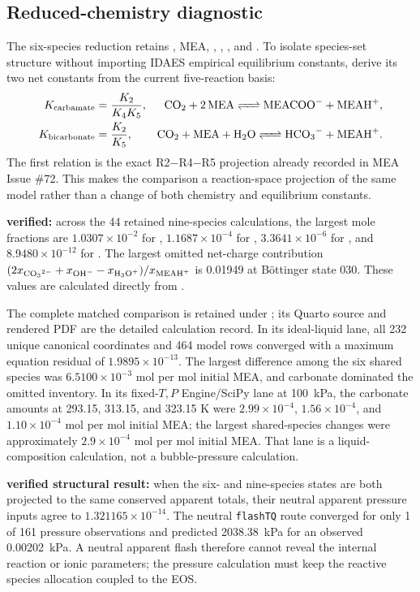 \documentclass[10pt,oneside]{scrartcl}
\begin{document}
\subsection{Reduced-chemistry diagnostic}

The six-species reduction retains , MEA, , ,
, and . To isolate species-set structure without
importing IDAES empirical equilibrium constants, derive its two net constants
from the current five-reaction basis:
\begin{align}
K_{\mathrm{carbamate}} &= \frac{K_2}{K_4K_5}, &
\ce{CO2 + 2MEA <=> MEACOO- + MEAH+},\\
K_{\mathrm{bicarbonate}} &= \frac{K_2}{K_5}, &
\ce{CO2 + MEA + H2O <=> HCO3- + MEAH+}.
\end{align}
The first relation is the exact R2$-$R4$-$R5 projection already recorded in
MEA Issue \#72. This makes the comparison a reaction-space projection of the
same model rather than a change of both chemistry and equilibrium constants.

\textbf{verified:} across the 44 retained nine-species calculations, the
largest mole fractions are $1.0307\times10^{-2}$ for ,
$1.1687\times10^{-4}$ for , $3.3641\times10^{-6}$ for ,
and $8.9480\times10^{-12}$ for . The largest omitted net-charge
contribution $(2x_{\ce{CO3^2-}}+x_{\ce{OH-}}-x_{\ce{H3O+}})/x_{\ce{MEAH+}}$
is 0.01949 at B\"ottinger state 030. These values are calculated directly
from .

The complete matched comparison is retained under
; its Quarto source and rendered
PDF are the detailed calculation record. In its ideal-liquid lane, all 232
unique canonical coordinates and 464 model rows converged with a maximum
equation residual of $1.9895\times10^{-13}$. The largest difference among the
six shared species was $6.5100\times10^{-3}$ mol per mol initial MEA, and
carbonate dominated the omitted inventory. In its fixed-$T,P$ Engine/SciPy
lane at \SI{100}{\kilo\pascal}, the carbonate amounts at 293.15, 313.15, and
323.15 K were $2.99\times10^{-4}$, $1.56\times10^{-4}$, and
$1.10\times10^{-4}$ mol per mol initial MEA; the largest shared-species changes
were approximately $2.9\times10^{-4}$ mol per mol initial MEA. That lane is a
liquid-composition calculation, not a bubble-pressure calculation.

\textbf{verified structural result:} when the six- and nine-species states are
both projected to the same conserved apparent totals, their neutral apparent
pressure inputs agree to $1.321165\times10^{-14}$. The neutral
\texttt{flashTQ} route converged for only 1 of 161 pressure observations and
predicted \SI{2038.38}{\kilo\pascal} for an observed
\SI{0.00202}{\kilo\pascal}. A neutral apparent flash therefore cannot reveal
the internal reaction or ionic parameters; the pressure calculation must keep
the reactive species allocation coupled to the EOS.
\end{document}
